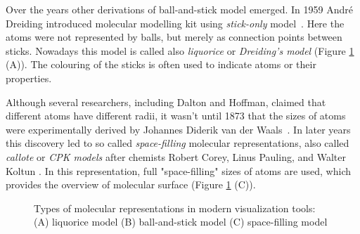 Over the years other derivations of ball-and-stick model emerged. In 1959 André Dreiding introduced molecular modelling kit using \textit{stick-only} model~\cite{dreiding1959einfache}. Here the atoms were not represented by balls, but merely as connection points between sticks. Nowadays this model is called also \textit{liquorice} or \textit{Dreiding's model} (Figure \ref{Fig:vis} (A)). The colouring of the sticks is often used to indicate atoms or their properties.

Although several researchers, including Dalton and Hoffman, claimed that different atoms have different radii, it wasn't until 1873 that the sizes of atoms were experimentally derived by Johannes Diderik van der Waals~\cite{Waals1873PhDThesis}. In later years this discovery led to so called \textit{space-filling} molecular representations, also called \textit{callote} or \textit{CPK models} after chemists Robert Corey, Linus Pauling, and Walter Koltun \cite{corey1953molecular}. In this representation, full "space-filling" sizes of atoms are used, which provides the overview of molecular surface (Figure \ref{Fig:vis} (C)).

\begin{figure}[H]
  \centering
  \caption{Types of molecular representations in modern visualization tools: (A) liquorice model (B) ball-and-stick model (C) space-filling model}
  \label{Fig:vis}  
\end{figure} 


